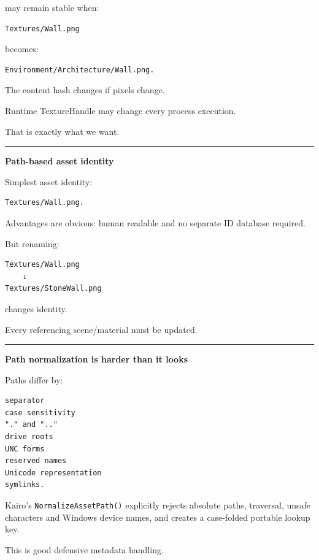 may remain stable when:

\begin{verbatim}
Textures/Wall.png
\end{verbatim}

becomes:

\begin{verbatim}
Environment/Architecture/Wall.png.
\end{verbatim}

The content hash changes if pixels change.

Runtime TextureHandle may change every process execution.

That is exactly what we want.

\begin{center}\rule{0.5\linewidth}{0.5pt}\end{center}

\textbf{Path-based asset identity}

Simplest asset identity:

\begin{verbatim}
Textures/Wall.png.
\end{verbatim}

Advantages are obvious: human readable and no separate ID database required.

But renaming:

\begin{verbatim}
Textures/Wall.png
    ↓
Textures/StoneWall.png
\end{verbatim}

changes identity.

Every referencing scene/material must be updated.

\begin{center}\rule{0.5\linewidth}{0.5pt}\end{center}

\textbf{Path normalization is harder than it looks}

Paths differ by:

\begin{verbatim}
separator
case sensitivity
"." and ".."
drive roots
UNC forms
reserved names
Unicode representation
symlinks.
\end{verbatim}

Kairo's \texttt{NormalizeAssetPath()} explicitly rejects absolute paths, traversal, unsafe characters and Windows device names, and creates a case-folded portable lookup key.

This is good defensive metadata handling.

